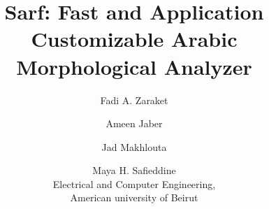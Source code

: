 \title[Sarf: Application Customizable Efficient Arabic Morphological Analyzer]
      {Sarf: Fast and Application Customizable Arabic Morphological Analyzer }
\author[F. Zaraket, A. Jaber, J. Makhlouta, and M. Safieddine]
       {Fadi A. Zaraket\and Ameen Jaber\and Jad Makhlouta\and Maya H. Safieddine\\
        Electrical and Computer Engineering,\\
        American university of Beirut}


